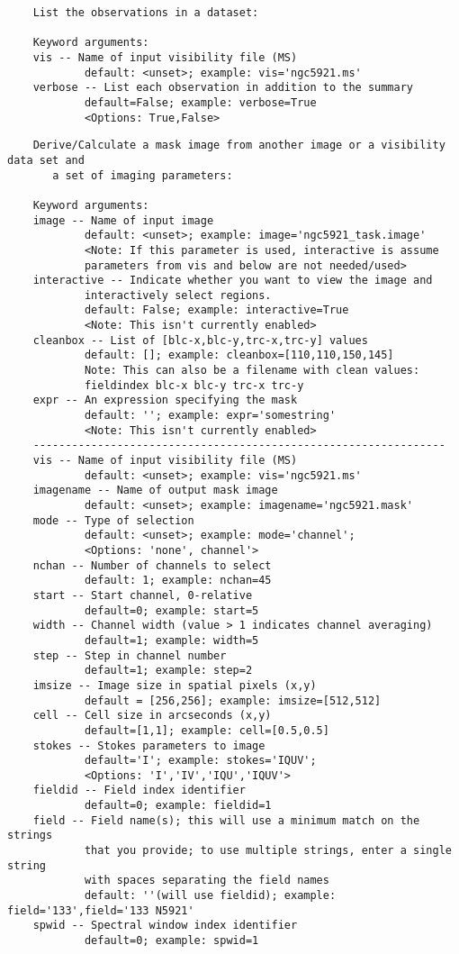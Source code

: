 \vspace{3mm}
\small
\begin{verbatim}
    List the observations in a dataset:
    
    Keyword arguments:
    vis -- Name of input visibility file (MS)
            default: <unset>; example: vis='ngc5921.ms'
    verbose -- List each observation in addition to the summary
            default=False; example: verbose=True
            <Options: True,False>
\end{verbatim}
\normalsize


\vspace{3mm}
\small
\begin{verbatim}
    Derive/Calculate a mask image from another image or a visibility data set and 
       a set of imaging parameters:
    
    Keyword arguments:
    image -- Name of input image
            default: <unset>; example: image='ngc5921_task.image'
            <Note: If this parameter is used, interactive is assume
            parameters from vis and below are not needed/used>
    interactive -- Indicate whether you want to view the image and
            interactively select regions.
            default: False; example: interactive=True
            <Note: This isn't currently enabled>
    cleanbox -- List of [blc-x,blc-y,trc-x,trc-y] values
            default: []; example: cleanbox=[110,110,150,145]
            Note: This can also be a filename with clean values:
            fieldindex blc-x blc-y trc-x trc-y
    expr -- An expression specifying the mask
            default: ''; example: expr='somestring'
            <Note: This isn't currently enabled>
    ----------------------------------------------------------------
    vis -- Name of input visibility file (MS)
            default: <unset>; example: vis='ngc5921.ms'
    imagename -- Name of output mask image
            default: <unset>; example: imagename='ngc5921.mask'
    mode -- Type of selection 
            default: <unset>; example: mode='channel'; 
            <Options: 'none', channel'>
    nchan -- Number of channels to select
            default: 1; example: nchan=45
    start -- Start channel, 0-relative
            default=0; example: start=5
    width -- Channel width (value > 1 indicates channel averaging)
            default=1; example: width=5
    step -- Step in channel number
            default=1; example: step=2      
    imsize -- Image size in spatial pixels (x,y)
            default = [256,256]; example: imsize=[512,512]
    cell -- Cell size in arcseconds (x,y)
            default=[1,1]; example: cell=[0.5,0.5]
    stokes -- Stokes parameters to image
            default='I'; example: stokes='IQUV'; 
            <Options: 'I','IV','IQU','IQUV'>
    fieldid -- Field index identifier
            default=0; example: fieldid=1
    field -- Field name(s); this will use a minimum match on the strings
            that you provide; to use multiple strings, enter a single string
            with spaces separating the field names
            default: ''(will use fieldid); example: field='133',field='133 N5921'
    spwid -- Spectral window index identifier
            default=0; example: spwid=1
\end{verbatim}

